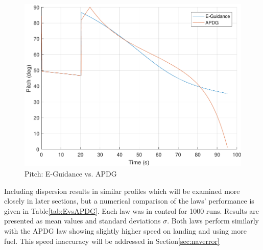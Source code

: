\begin{figure}[H]
	\centering
	\begin{minipage}{4.5 in}
		\includegraphics[width=\linewidth]{Figures/fatEvsAPDG.pdf}
		\caption{Pitch: E-Guidance vs. APDG \label{fig:fatEvsAPDG} }
	\end{minipage}
\end{figure}

Including dispersion results in similar profiles which will be examined more closely in later sections, but a numerical comparison of the laws' performance is given in Table\:\ref{tab:EvsAPDG}. Each law was in control for 1000 runs. Results are presented as mean values and standard deviations $\sigma$. Both laws perform similarly with the APDG law showing slightly higher speed on landing and using more fuel. This speed inaccuracy will be addressed in Section\:\ref{sec:naverror}

